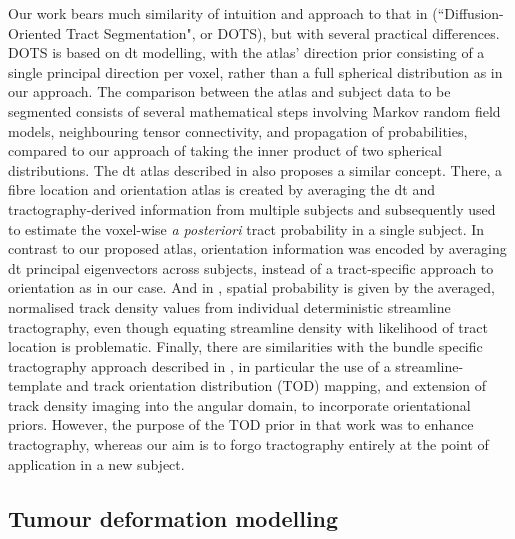 Our work bears much similarity of intuition and approach to that in \textcite{Bazin2011} (``Diffusion-Oriented Tract Segmentation", or DOTS), but with several practical differences.
DOTS is based on \gls{dt} modelling, with the atlas' direction prior consisting of a single principal direction per voxel, rather than a full spherical distribution as in our approach.
The comparison between the atlas and subject data to be segmented consists of several mathematical steps involving Markov random field models, neighbouring tensor connectivity, and propagation of probabilities, compared to our approach of taking the inner product of two spherical distributions.
The \gls{dt} atlas described in \textcite{Hagler2009} also proposes a similar concept.
There, a fibre location and orientation atlas is created by averaging the \gls{dt} and tractography-derived information from multiple subjects and subsequently used to estimate the voxel-wise \textit{a posteriori} tract probability in a single subject.
In contrast to our proposed atlas, orientation information was encoded by averaging \gls{dt} principal eigenvectors across subjects, instead of a tract-specific approach to orientation as in our case.
And in \textcite{Hagler2009}, spatial probability is given by the averaged, normalised track density values from individual deterministic streamline tractography, even though equating streamline density with likelihood of tract location is problematic.\autocite{Rheault2019,Smith2013}
Finally, there are similarities with the bundle specific tractography approach described in \textcite{Rheault2019}, in particular the use of a streamline-template and track orientation distribution (TOD) mapping,\autocite{Dhollander2014} and extension of track density imaging\autocite{Calamante2010} into the angular domain, to incorporate orientational priors.
However, the purpose of the TOD prior in that work was to enhance tractography, whereas our aim is to forgo tractography entirely at the point of application in a new subject.

\subsection{Tumour deformation modelling}


